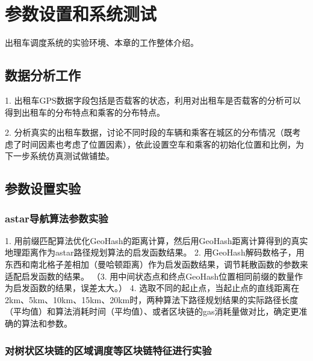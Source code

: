 \chapter{参数设置和系统测试}
出租车调度系统的实验环境、本章的工作整体介绍。

\section{数据分析工作}

1. 出租车GPS数据字段包括是否载客的状态，利用对出租车是否载客的分析可以得到出租车的分布特点和乘客的分布特点。

2. 分析真实的出租车数据，讨论不同时段的车辆和乘客在城区的分布情况（既考虑了时间因素也考虑了位置因素），依此设置空车和乘客的初始化位置和比例，为下一步系统仿真测试做铺垫。

\section{参数设置实验}

\subsection{astar导航算法参数实验}
1. 用前缀匹配算法优化GeoHash的距离计算，然后用GeoHash距离计算得到的真实地理距离作为astar路径规划算法的启发函数结果。
2. 用GeoHash解码数格子，用东西和南北格子差相加（曼哈顿距离）作为启发函数结果，调节耗散函数的参数来适配启发函数的结果。
（3. 用中间状态点和终点GeoHash位置相同前缀的数量作为启发函数的结果，误差太大。）
4. 选取不同的起止点，当起止点的直线距离在2km、5km、10km、15km、20km时，两种算法下路径规划结果的实际路径长度（平均值）和算法消耗时间（平均值）、或者区块链的gas消耗量做对比，确定更准确的算法和参数。





\subsection{对树状区块链的区域调度等区块链特征进行实验}

